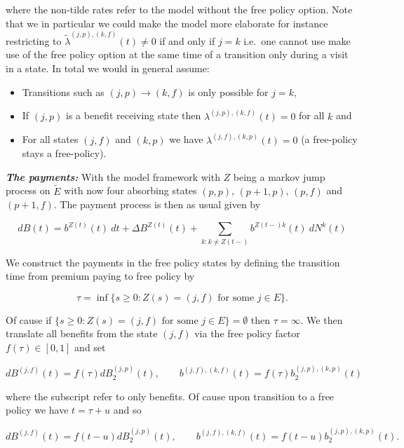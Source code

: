 \documentclass[a4paper,10pt,openany]{book}
\providecommand{\tightlist}{%
 \setlength{\itemsep}{0pt}\setlength{\parskip}{0pt}}
\begin{document}
where the non-tilde rates refer to the model without the free policy option. Note that we in particular we could make the model more elaborate for instance restricting to \(\widetilde \lambda^{(j,p),(k,f)}(t)\ne 0\) if and only if \(j=k\) i.e.~one cannot use make use of the free policy option at the same time of a transition only during a visit in a state. In total we would in general assume:

\begin{itemize}
\tightlist
\item
  Transitions such as \((j,p)\to (k,f)\) is only possible for \(j=k\),
\item
  If \((j,p)\) is a benefit receiving state then \(\lambda^{(j,p),(k,f)}(t)=0\) for all \(k\) and
\item
  For all states \((j,f)\) and \((k,p)\) we have \(\lambda^{(j,f),(k,p)}(t)=0\) (a free-policy stays a free-policy).
\end{itemize}

\emph{\textbf{The payments:}} With the model framework with \(Z\) being a markov jump process on \(\widetilde E\) with now four absorbing states \((p,p)\), \((p+1,p)\), \((p,f)\) and \((p+1,f)\). The payment process is then as usual given by

\[
dB(t)=b^{Z(t)}(t)\ dt+\Delta B^{Z(t)}(t)+\sum_{k:k\ne Z(t-)}b^{Z(t-)k}(t)\ dN^k(t)
\]

We construct the payments in the free policy states by defining the transition time from premium paying to free policy by

\[
\tau=\inf\{s\ge 0:Z(s)=(j,f)\text{ for some }j\in E\}.
\]

Of cause if \(\{s\ge 0:Z(s)=(j,f)\text{ for some }j\in E\}=\emptyset\) then \(\tau =\infty\). We then translate all benefits from the state \((j,f)\) via the free policy factor \(f(\tau)\in[0,1]\) and set

\[
dB^{(j,f)}(t)=f(\tau)dB^{(j,p)}_2(t),\qquad b^{(j,f),(k,f)}(t)=f(\tau)b^{(j,p),(k,p)}_2(t)
\]

where the subscript refer to only benefits. Of cause upon transition to a free policy we have \(t=\tau + u\) and so

\[
dB^{(j,f)}(t)=f(t-u)dB^{(j,p)}_2(t),\qquad b^{(j,f),(k,f)}(t)=f(t-u)b^{(j,p),(k,p)}_2(t).
\]
\end{document}
